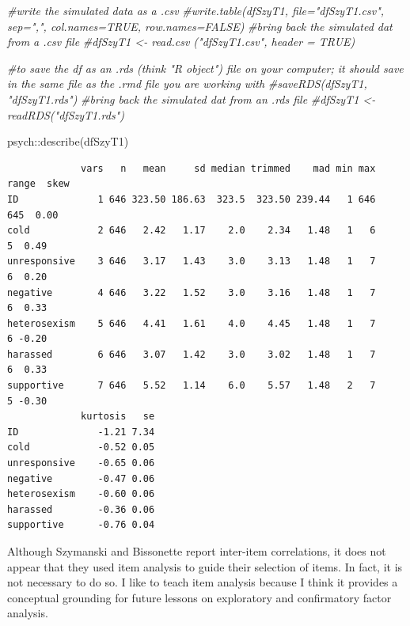 \documentclass[
  english,
]{book}
\newenvironment{Shaded}{\begin{snugshade}}{\end{snugshade}}
\newcommand{\CommentTok}[1]{\textcolor[rgb]{0.56,0.35,0.01}{\textit{#1}}}
\newcommand{\FunctionTok}[1]{\textcolor[rgb]{0.00,0.00,0.00}{#1}}
\newcommand{\NormalTok}[1]{#1}
\newcommand{\SpecialCharTok}[1]{\textcolor[rgb]{0.00,0.00,0.00}{#1}}
\begin{document}
\begin{Shaded}
\begin{Highlighting}[]
\CommentTok{\#write the simulated data  as a .csv}
\CommentTok{\#write.table(dfSzyT1, file="dfSzyT1.csv", sep=",", col.names=TRUE, row.names=FALSE)}
\CommentTok{\#bring back the simulated dat from a .csv file}
\CommentTok{\#dfSzyT1 \textless{}{-} read.csv ("dfSzyT1.csv", header = TRUE)}
\end{Highlighting}
\end{Shaded}

\begin{Shaded}
\begin{Highlighting}[]
\CommentTok{\#to save the df as an .rds (think "R object") file on your computer; it should save in the same file as the .rmd file you are working with}
\CommentTok{\#saveRDS(dfSzyT1, "dfSzyT1.rds")}
\CommentTok{\#bring back the simulated dat from an .rds file}
\CommentTok{\#dfSzyT1 \textless{}{-} readRDS("dfSzyT1.rds")}
\end{Highlighting}
\end{Shaded}

\begin{Shaded}
\begin{Highlighting}[]
\NormalTok{psych}\SpecialCharTok{::}\FunctionTok{describe}\NormalTok{(dfSzyT1)}
\end{Highlighting}
\end{Shaded}

\begin{verbatim}
             vars   n   mean     sd median trimmed    mad min max range  skew
ID              1 646 323.50 186.63  323.5  323.50 239.44   1 646   645  0.00
cold            2 646   2.42   1.17    2.0    2.34   1.48   1   6     5  0.49
unresponsive    3 646   3.17   1.43    3.0    3.13   1.48   1   7     6  0.20
negative        4 646   3.22   1.52    3.0    3.16   1.48   1   7     6  0.33
heterosexism    5 646   4.41   1.61    4.0    4.45   1.48   1   7     6 -0.20
harassed        6 646   3.07   1.42    3.0    3.02   1.48   1   7     6  0.33
supportive      7 646   5.52   1.14    6.0    5.57   1.48   2   7     5 -0.30
             kurtosis   se
ID              -1.21 7.34
cold            -0.52 0.05
unresponsive    -0.65 0.06
negative        -0.47 0.06
heterosexism    -0.60 0.06
harassed        -0.36 0.06
supportive      -0.76 0.04
\end{verbatim}

Although Szymanski and Bissonette report inter-item correlations, it does not appear that they used item analysis to guide their selection of items. In fact, it is not necessary to do so. I like to teach item analysis because I think it provides a conceptual grounding for future lessons on exploratory and confirmatory factor analysis.
\end{document}
